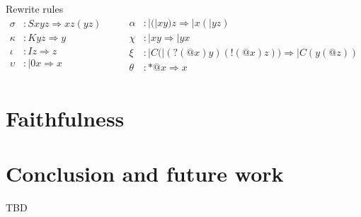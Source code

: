 \documentclass{llncs}
\begin{document}
Rewrite rules
\[\begin{array}{rl}
  \sigma &: Sxyz \Rightarrow xz(yz) \\
  \kappa &: Kyz \Rightarrow y \\
  \iota &: Iz \Rightarrow z \\
  \upsilon &: |0x \Rightarrow x \\
\end{array} \quad \quad
\begin{array}{rl}
  \alpha &: |(|xy)z \Rightarrow |x(|yz) \\
  \chi &: |xy \Rightarrow |yx \\
  \xi &: |C(|(?(@x)y)(!(@x)z)) \Rightarrow |C(y(@z)) \\
  \theta &: *@x \Rightarrow x \\
\end{array}\]

\section{Faithfulness}

\section{Conclusion and future work}
TBD



\end{document}
